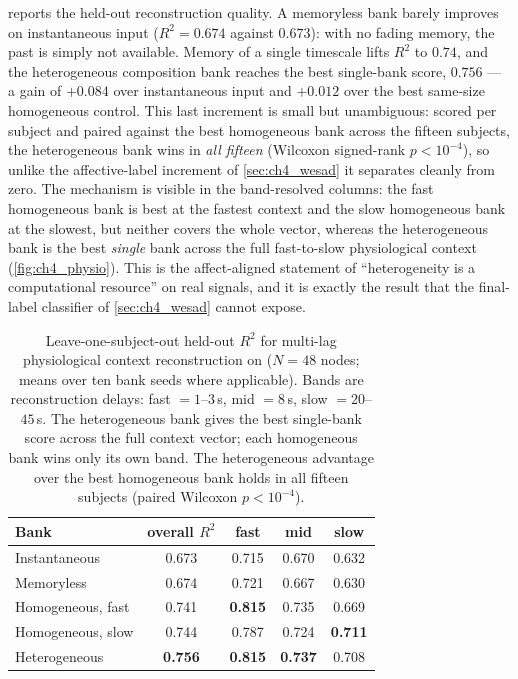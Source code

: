 \documentclass[12pt, twoside]{report}
\begin{document}
 reports the held-out reconstruction quality. A memoryless bank barely improves on instantaneous input ($R^2 = 0.674$ against $0.673$): with no fading memory, the past is simply not available. Memory of a single timescale lifts $R^2$ to $0.74$, and the heterogeneous composition bank reaches the best single-bank score, $0.756$ --- a gain of $+0.084$ over instantaneous input and $+0.012$ over the best same-size homogeneous control. This last increment is small but unambiguous: scored per subject and paired against the best homogeneous bank across the fifteen subjects, the heterogeneous bank wins in \emph{all fifteen} (Wilcoxon signed-rank $p < 10^{-4}$), so unlike the affective-label increment of \cref{sec:ch4_wesad} it separates cleanly from zero. The mechanism is visible in the band-resolved columns: the fast homogeneous bank is best at the fastest context and the slow homogeneous bank at the slowest, but neither covers the whole vector, whereas the heterogeneous bank is the best \emph{single} bank across the full fast-to-slow physiological context (\cref{fig:ch4_physio}). This is the affect-aligned statement of ``heterogeneity is a computational resource'' on real signals, and it is exactly the result that the final-label classifier of \cref{sec:ch4_wesad} cannot expose.

\begin{table}[t]
  \centering
  \small
  \setlength{\tabcolsep}{5pt}
  \caption[Physiological temporal-context reconstruction on WESAD]{Leave-one-subject-out held-out $R^2$ for multi-lag physiological context reconstruction on \WESAD{} ($N=48$ nodes; means over ten bank seeds where applicable). Bands are reconstruction delays: fast $=1$--$3$\,s, mid $=8$\,s, slow $=20$--$45$\,s. The heterogeneous bank gives the best single-bank score across the full context vector; each homogeneous bank wins only its own band. The heterogeneous advantage over the best homogeneous bank holds in all fifteen subjects (paired Wilcoxon $p<10^{-4}$).}
  \label{tab:ch4_physio}
  \begin{tabular}{lcccc}
    \toprule
    Bank & overall $R^2$ & fast & mid & slow \\
    \midrule
    Instantaneous     & 0.673 & 0.715 & 0.670 & 0.632 \\
    Memoryless        & 0.674 & 0.721 & 0.667 & 0.630 \\
    Homogeneous, fast & 0.741 & \textbf{0.815} & 0.735 & 0.669 \\
    Homogeneous, slow & 0.744 & 0.787 & 0.724 & \textbf{0.711} \\
    Heterogeneous     & \textbf{0.756} & \textbf{0.815} & \textbf{0.737} & 0.708 \\
    \bottomrule
  \end{tabular}
\end{table}
\end{document}
